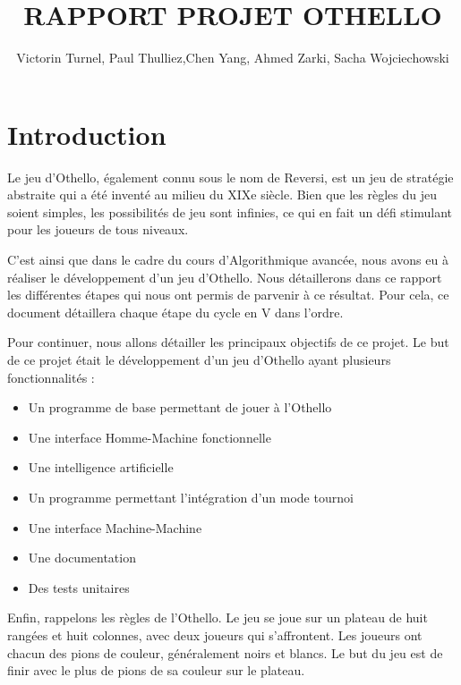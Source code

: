 \documentclass{article}
\title{RAPPORT PROJET OTHELLO}
\author{Victorin Turnel, Paul Thulliez,Chen Yang, Ahmed Zarki, Sacha Wojciechowski}
\begin{document}
\maketitle
\newpage
\tableofcontents

\newpage

\section{Introduction}
Le jeu d'Othello, également connu sous le nom de Reversi, est un jeu de stratégie abstraite qui a été inventé au milieu du XIXe siècle. Bien que les règles du jeu soient simples, les possibilités de jeu sont infinies, ce qui en fait un défi stimulant pour les joueurs de tous niveaux.

\vspace{5mm}

C'est ainsi que dans le cadre du cours d'Algorithmique avancée, nous avons eu à réaliser le développement d'un jeu d'Othello. Nous détaillerons dans ce rapport les différentes étapes qui nous ont permis de parvenir à ce résultat. Pour cela, ce document détaillera chaque étape du cycle en V dans l'ordre. 

\vspace{5mm}

Pour continuer, nous allons détailler les principaux objectifs de ce projet. Le but de ce projet était le développement d'un jeu d'Othello ayant plusieurs fonctionnalités :
\begin{itemize}
    \item Un programme de base permettant de jouer à l'Othello
    \item Une interface Homme-Machine fonctionnelle
    \item Une intelligence artificielle
    \item Un programme permettant l'intégration d'un mode tournoi
    \item Une interface Machine-Machine
    \item Une documentation
    \item Des tests unitaires
\end{itemize}

\vspace{5mm}


Enfin, rappelons les règles de l'Othello. Le jeu se joue sur un plateau de huit rangées et huit colonnes, avec deux joueurs qui s'affrontent. Les joueurs ont chacun des pions de couleur, généralement noirs et blancs. Le but du jeu est de finir avec le plus de pions de sa couleur sur le plateau.
\end{document}

